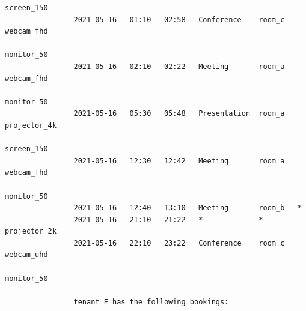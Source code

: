 \documentclass{article}
\begin{document}
\begin{Verbatim}[gobble=8]
                                                                    screen_150
                2021-05-16   01:10   02:58   Conference    room_c   webcam_fhd
                                                                    monitor_50
                2021-05-16   02:10   02:22   Meeting       room_a   webcam_fhd
                                                                    monitor_50
                2021-05-16   05:30   05:48   Presentation  room_a   projector_4k
                                                                    screen_150
                2021-05-16   12:30   12:42   Meeting       room_a   webcam_fhd
                                                                    monitor_50
                2021-05-16   12:40   13:10   Meeting       room_b   *
                2021-05-16   21:10   21:22   *             *        projector_2k
                2021-05-16   22:10   23:22   Conference    room_c   webcam_uhd
                                                                    monitor_50
                
                tenant_E has the following bookings:
                

\end{Verbatim}
\end{document}
